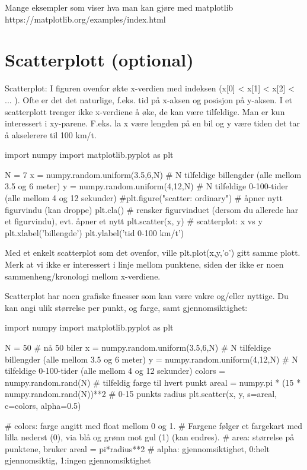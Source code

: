 Mange eksempler som viser hva man kan gjøre med matplotlib
https://matplotlib.org/examples/index.html

\section{Scatterplott (optional)}

Scatterplot:
I figuren ovenfor økte x-verdien med indeksen (x[0] < x[1] < x[2] < ... ). Ofte er det det naturlige, f.eks. tid på x-aksen og posisjon på y-aksen. I et scatterplott trenger ikke x-verdiene å øke, de kan være tilfeldige. Man er kun interessert i xy-parene. F.eks. la x være lengden på en bil og y være tiden det tar å akselerere til 100 km/t.

\begin{usncodebox}
import numpy 
import matplotlib.pyplot as plt

N = 7
x = numpy.random.uniform(3.5,6,N)   # N tilfeldige billengder (alle mellom 3.5 og 6 meter)
y = numpy.random.uniform(4,12,N)    # N tilfeldige 0-100-tider (alle mellom 4 og 12 sekunder)
#plt.figure("scatter: ordinary")    # åpner nytt figurvindu  (kan droppe)
plt.cla()                           # rensker figurvinduet (dersom du allerede har et figurvindu), evt. åpner et nytt
plt.scatter(x, y)                   # scatterplot: x vs y
plt.xlabel('billengde')
plt.ylabel('tid 0-100 km/t')
\end{usncodebox}

Med et enkelt scatterplot som det ovenfor, ville plt.plot(x,y,'o') gitt samme plott. Merk at vi ikke er interessert i linje mellom punktene, siden der ikke er noen sammenheng/kronologi mellom x-verdiene. 

Scatterplot har noen grafiske finesser som kan være vakre og/eller nyttige. Du kan angi ulik størrelse per punkt, og farge, samt gjennomsiktighet: 

\begin{usncodebox}
import numpy 
import matplotlib.pyplot as plt

N = 50   # nå 50 biler 
x = numpy.random.uniform(3.5,6,N)   # N tilfeldige billengder (alle mellom 3.5 og 6 meter)
y = numpy.random.uniform(4,12,N)    # N tilfeldige 0-100-tider (alle mellom 4 og 12 sekunder)
colors = numpy.random.rand(N)       # tilfeldig farge til hvert punkt
areal = numpy.pi * (15 * numpy.random.rand(N))**2    # 0-15 punkts radius 
plt.scatter(x, y, s=areal, c=colors, alpha=0.5)

# colors: farge angitt med float mellom 0 og 1.
# Fargene følger et fargekart med lilla nederst (0), via blå og grønn mot gul (1) (kan endres). 
# area: størrelse på punktene, bruker areal = pi*radius**2
# alpha: gjennomsiktighet, 0:helt gjennomsiktig, 1:ingen gjennomsiktighet
\end{usncodebox}

